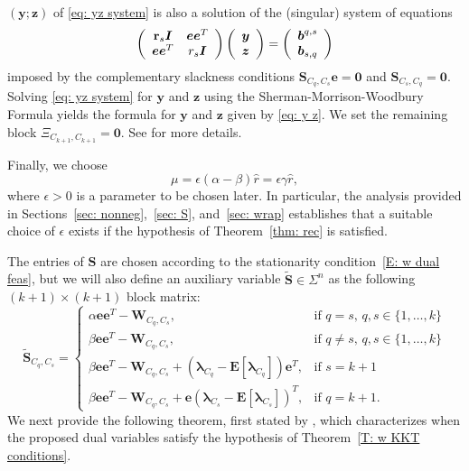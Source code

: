 \documentclass[twoside,11pt]{article}
\renewcommand{\S}{\mathbf{S}}
\newcommand{\E}{\mathbf{E}}
\newcommand{\St}{\bs{\tilde S}}
\renewcommand{\b}{{\bs{b}}}
\newcommand{\e}{\bs {e}}
\renewcommand{\r}{\mathbf{r}}
\newcommand{\bs}{\boldsymbol}
\newcommand{\y}{\bs {y}}
\newcommand{\W}{\bs {W}}
\newcommand{\z}{\bs{z}}
\newcommand{\0}{\bs{0}}
\newcommand{\vect}[1] {\ensuremath{\left(\begin{array}{c} #1 \end{array} \right)}} %
\newcommand{\mat}[1] {\ensuremath{ \left(\begin{array} #1 \end{array} \right)}} %
\newcommand{\branchdef}[1] {\ensuremath{ \left\{\begin{array}{rl} #1 \end{array} \right. }} %
\begin{document}
{\((\y; \z)\) of \eqref{eq: yz system}
is also a solution of the (singular) system of equations
\[
	\mat{{cc} \r_s \I & \e\e^T  \\ \e\e^T & r_s \I }
	\vect{ \y \\ \z } = \vect{\b^{q,s} \\ \b_{s,q} }
\]
imposed by the complementary slackness conditions
${\S_{C_q, C_s} \e = \0}$ and ${\S_{C_s, C_q} = \0 }$.
Solving \eqref{eq: yz system} for ${\y}$ and $\z$ 
using the Sherman-Morrison-Woodbury 
Formula
yields the formula for $\y$ and $\z$ given by
\eqref{eq: y z}.
We set the remaining block $\Xi_{C_{k+1}, C_{k+1} } = \0$.
See \citet[Section~4.2]{ames2014guaranteed} for more details.

Finally, we choose 
\begin{equation} \label{eq: mu}
\mu = \epsilon (\alpha - \beta) \hat r = \epsilon \gamma \hat r,
\end{equation}
where \(\epsilon > 0\) is a parameter to be chosen later.
In particular, the analysis provided in Sections~\ref{sec: nonneg},~\ref{sec: S}, and~\ref{sec: wrap} establishes that
a suitable choice of $\epsilon$ exists if the hypothesis of
Theorem~\ref{thm: rec} is satisfied.

The entries of \(\S\) are chosen according to the stationarity condition~\eqref{E: w dual feas}, but we will also define
an auxiliary variable \(\St \in \Sigma^n\) as the following \((k+1)\times (k+1)\) block matrix:
\begin{equation} \label{e: tilde S def}
\St_{C_q, C_s} = \branchdef{ 	
	\alpha \e\e^T - \W_{C_q, C_s},  & \mbox{if } q = s, \, q, s \in \{1,\dots, k\} \\
	\beta \e\e^T - \W_{C_q, C_s},  & \mbox{if } q \neq s, \, q, s \in \{1,\dots, k\} \\
	\beta \e\e^T - \W_{C_q, C_s} + (\bs\lambda_{C_q} - \E[\bs\lambda_{C_q}] )\e^T ,  & \mbox{if } s = {k+1}  \\
	\beta \e\e^T - \W_{C_q, C_s} + \e (\bs \lambda_{C_s} - \E[\bs\lambda_{C_s}] )^T,   & \mbox{if } q = {k+1} .
}						
\end{equation}
We next provide the following theorem, first stated by \citet[Theorem~4.2]{ames2014guaranteed},
which characterizes when the proposed dual variables satisfy the hypothesis
of Theorem~\ref{T:  w KKT conditions}.

}
\end{document}
